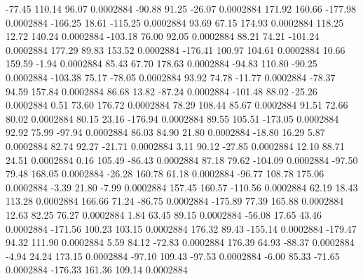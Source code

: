       -77.45      110.14       96.07     0.0002884
      -90.88       91.25      -26.07     0.0002884
      171.92      160.66     -177.98     0.0002884
     -166.25       18.61     -115.25     0.0002884
       93.69       67.15      174.93     0.0002884
      118.25       12.72      140.24     0.0002884
     -103.18       76.00       92.05     0.0002884
       88.21       74.21     -101.24     0.0002884
      177.29       89.83      153.52     0.0002884
     -176.41      100.97      104.61     0.0002884
       10.66      159.59       -1.94     0.0002884
       85.43       67.70      178.63     0.0002884
      -94.83      110.80      -90.25     0.0002884
     -103.38       75.17      -78.05     0.0002884
       93.92       74.78      -11.77     0.0002884
      -78.37       94.59      157.84     0.0002884
       86.68       13.82      -87.24     0.0002884
     -101.48       88.02      -25.26     0.0002884
        0.51       73.60      176.72     0.0002884
       78.29      108.44       85.67     0.0002884
       91.51       72.66       80.02     0.0002884
       80.15       23.16     -176.94     0.0002884
       89.55      105.51     -173.05     0.0002884
       92.92       75.99      -97.94     0.0002884
       86.03       84.90       21.80     0.0002884
      -18.80       16.29        5.87     0.0002884
       82.74       92.27      -21.71     0.0002884
        3.11       90.12      -27.85     0.0002884
       12.10       88.71       24.51     0.0002884
        0.16      105.49      -86.43     0.0002884
       87.18       79.62     -104.09     0.0002884
      -97.50       79.48      168.05     0.0002884
      -26.28      160.78       61.18     0.0002884
      -96.77      108.78      175.06     0.0002884
       -3.39       21.80       -7.99     0.0002884
      157.45      160.57     -110.56     0.0002884
       62.19       18.43      113.28     0.0002884
      166.66       71.24      -86.75     0.0002884
     -175.89       77.39      165.88     0.0002884
       12.63       82.25       76.27     0.0002884
        1.84       63.45       89.15     0.0002884
      -56.08       17.65       43.46     0.0002884
     -171.56      100.23      103.15     0.0002884
      176.32       89.43     -155.14     0.0002884
     -179.47       94.32      111.90     0.0002884
        5.59       84.12      -72.83     0.0002884
      176.39       64.93      -88.37     0.0002884
       -4.94       24.24      173.15     0.0002884
      -97.10      109.43      -97.53     0.0002884
       -6.00       85.33      -71.65     0.0002884
     -176.33      161.36      109.14     0.0002884
